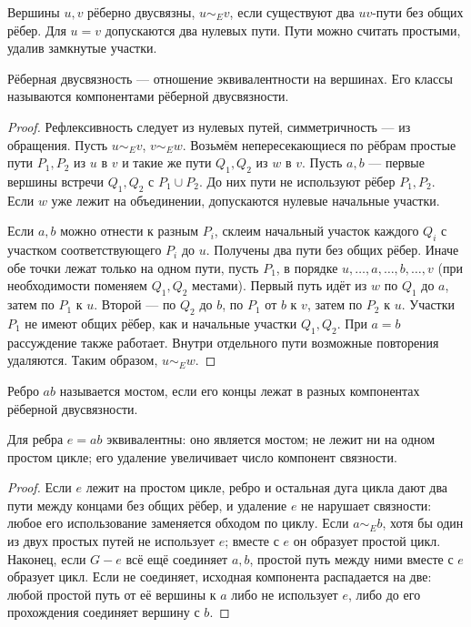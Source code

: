 \begin{definition}
Вершины \(u,v\) рёберно двусвязны, \(u\sim_E v\), если существуют
два \(uv\)-пути без общих рёбер. Для \(u=v\) допускаются два нулевых пути.
Пути можно считать простыми, удалив замкнутые участки.
\end{definition}
\begin{theorem}
Рёберная двусвязность — отношение эквивалентности на вершинах.
Его классы называются компонентами рёберной двусвязности.
\end{theorem}
\begin{proof}
Рефлексивность следует из нулевых путей, симметричность — из обращения.
Пусть \(u\sim_E v\), \(v\sim_E w\). Возьмём непересекающиеся по рёбрам
простые пути \(P_1,P_2\) из \(u\) в \(v\) и такие же пути \(Q_1,Q_2\)
из \(w\) в \(v\). Пусть \(a,b\) — первые вершины встречи \(Q_1,Q_2\)
с \(P_1\cup P_2\). До них пути не используют рёбер \(P_1,P_2\).
Если \(w\) уже лежит на объединении, допускаются нулевые начальные участки.

Если \(a,b\) можно отнести к разным \(P_i\), склеим начальный участок
каждого \(Q_i\) с участком соответствующего \(P_i\) до \(u\).
Получены два пути без общих рёбер. Иначе обе точки лежат только
на одном пути, пусть \(P_1\), в порядке \(u,\ldots,a,\ldots,b,\ldots,v\)
(при необходимости поменяем \(Q_1,Q_2\) местами).
Первый путь идёт из \(w\) по \(Q_1\) до \(a\), затем по \(P_1\) к \(u\).
Второй — по \(Q_2\) до \(b\), по \(P_1\) от \(b\) к \(v\), затем
по \(P_2\) к \(u\). Участки \(P_1\) не имеют общих рёбер, как и
начальные участки \(Q_1,Q_2\). При \(a=b\) рассуждение также работает.
Внутри отдельного пути возможные повторения удаляются.
Таким образом, \(u\sim_E w\).
\end{proof}


\begin{definition}[Мост]
Ребро \(ab\) называется мостом, если его концы лежат в разных компонентах
рёберной двусвязности.
\end{definition}
\begin{lemma}\label{lem:bridge}
Для ребра \(e=ab\) эквивалентны: оно является мостом; не лежит
ни на одном простом цикле; его удаление увеличивает число компонент связности.
\end{lemma}
\begin{proof}
Если \(e\) лежит на простом цикле, ребро и остальная дуга цикла дают
два пути между концами без общих рёбер, и удаление \(e\) не нарушает
связности: любое его использование заменяется обходом по циклу.
Если \(a\sim_E b\), хотя бы один из двух простых путей не использует
\(e\); вместе с \(e\) он образует простой цикл.
Наконец, если \(G-e\) всё ещё соединяет \(a,b\), простой путь между
ними вместе с \(e\) образует цикл. Если не соединяет, исходная компонента
распадается на две: любой простой путь от её вершины к \(a\) либо не использует
\(e\), либо до его прохождения соединяет вершину с \(b\).
\end{proof}


